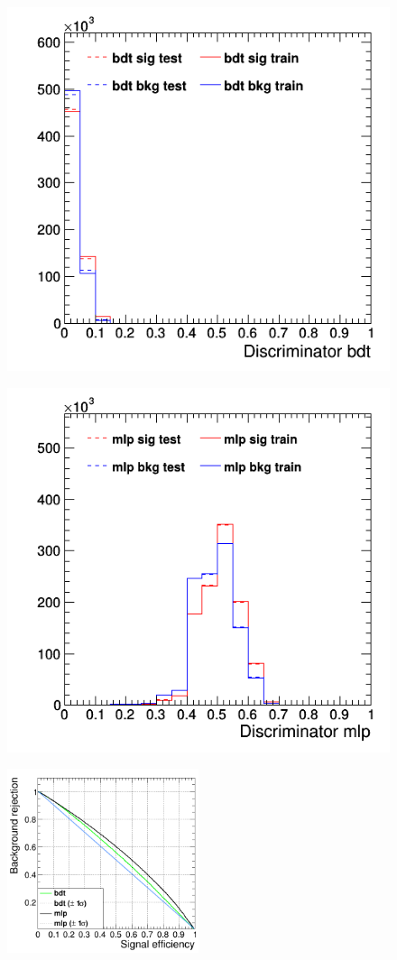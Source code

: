 \documentclass[11pt]{scrartcl}
\begin{document}
	\begin{figure}[H]
	\centering
	\begin{minipage}{.5\textwidth}
	  \centering
	  \includegraphics[width=0.75\linewidth]{figures/MVA/select1/config3/discriminator_bdt.png}
	  \label{fig:distr_s1_config3_bdt}
	\end{minipage}%
	\begin{minipage}{.5\textwidth}
	  \centering
	  \includegraphics[width=0.75\linewidth]{figures/MVA/select1/config3/discriminator_mlp.png}
	  \label{fig:distr_s1_config3_mlp}
	\end{minipage}
	\centering
	\includegraphics[width=0.5\textwidth]{figures/MVA/select1/config3/FOM_selection1_nL10_nT1000_mD5_nC50.png}

\end{figure}
\end{document}
